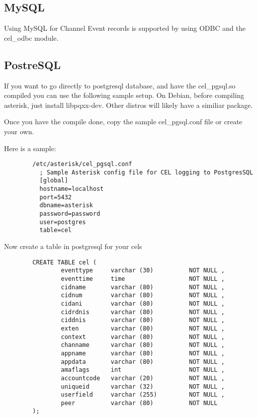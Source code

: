 \subsection{MySQL}

Using MySQL for Channel Event records is supported by using ODBC and the cel\_odbc module.

\subsection{PostreSQL}
        If you want to go directly to postgresql database, and have the cel\_pgsql.so
        compiled you can use the following sample setup.
        On Debian, before compiling asterisk, just install libpqxx-dev.
        Other distros will likely have a similiar package.

        Once you have the compile done,
        copy the sample cel\_pgsql.conf file or create your own.

        Here is a sample:
\begin{verbatim}
        /etc/asterisk/cel_pgsql.conf
          ; Sample Asterisk config file for CEL logging to PostgresSQL
          [global]
          hostname=localhost
          port=5432
          dbname=asterisk
          password=password
          user=postgres
          table=cel
\end{verbatim}
        Now create a table in postgresql for your cels

\begin{verbatim}
        CREATE TABLE cel (
                eventtype     varchar (30)          NOT NULL ,
                eventtime     time                  NOT NULL ,
                cidname       varchar (80)          NOT NULL ,
                cidnum        varchar (80)          NOT NULL ,
                cidani        varchar (80)          NOT NULL ,
                cidrdnis      varchar (80)          NOT NULL ,
                ciddnis       varchar (80)          NOT NULL ,
                exten         varchar (80)          NOT NULL ,
                context       varchar (80)          NOT NULL ,
                channame      varchar (80)          NOT NULL ,
                appname       varchar (80)          NOT NULL ,
                appdata       varchar (80)          NOT NULL ,
                amaflags      int                   NOT NULL ,
                accountcode   varchar (20)          NOT NULL ,
                uniqueid      varchar (32)          NOT NULL ,
                userfield     varchar (255)         NOT NULL ,
                peer          varchar (80)          NOT NULL
        );
\end{verbatim}

